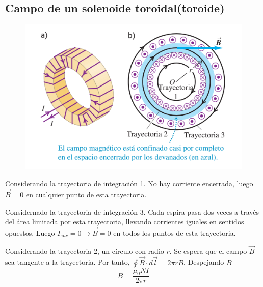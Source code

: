 \subsection{Campo de un solenoide toroidal(toroide)}
\begin{figure}[t]
\centering
\includegraphics[scale=0.5]{fig/toroide}
\end{figure}
Considerando la trayectoria de integración 1. No hay corriente encerrada, luego $\vec{B}=0$ en cualquier punto de esta trayectoria.

Considernado la trayectoria de integración 3. Cada espira pasa dos veces a través del área limitada por esta trayectoria, llevando corrientes iguales en sentidos opuestos. Luego $I_{enc}=0\rightarrow \vec{B}=0$ en todos los puntos de esta trayectoria.

Considerando la trayectoria 2, un círculo con radio $r$. Se espera que el campo $\vec{B}$ sea tangente a la trayectoria. Por tanto, $\oint\vec{B}\cdot d\vec{l}=2\pi rB$. Despejando $B$
\begin{equation}\label{28.24.toroide}
B=\frac{\mu_0NI}{2\pi r}
\end{equation}
%
